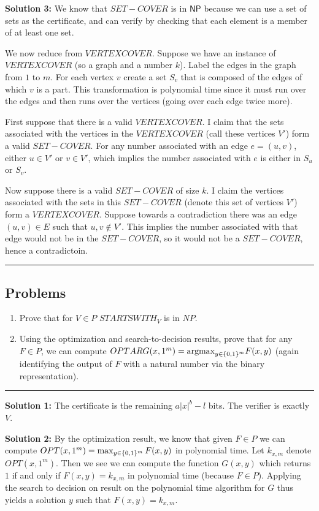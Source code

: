 \documentclass[10pt]{article}
\newcommand{\Line}{\vspace{.3cm}\hrule\vspace{.3cm}}
\begin{document}
\textbf{Solution 3:} We know that $SET-COVER$ is in $\mathsf{NP}$ because we can use a set of sets as the certificate, and can verify by checking that each element is a member of at least one set.

We now reduce from $VERTEXCOVER$. Suppose we have an instance of $VERTEXCOVER$ (so a graph and a number $k$). Label the edges in the graph from $1$ to $m$. For each vertex $v$ create a set $S_v$ that is composed of the edges of which $v$ is a part. This transformation is polynomial time since it must run over the edges and then runs over the vertices (going over each edge twice more).

First suppose that there is a valid $VERTEXCOVER$. I claim that the sets associated with the vertices in the $VERTEXCOVER$ (call these vertices $V'$) form a valid $SET-COVER$. For any number associated with an edge $e = (u,v)$, either $u\in V'$ or $v\in V'$, which implies the number associated with $e$ is either in $S_u$ or $S_v$.

Now suppose there is a valid $SET-COVER$ of size $k$. I claim the vertices associated with the sets in this $SET-COVER$ (denote this set of vertices $V'$) form a $VERTEXCOVER$. Suppose towards a contradiction there was an edge $(u,v)\in E$ such that $u,v\notin V'$. This implies the number associated with that edge would not be in the $SET-COVER$, so it would not be a $SET-COVER$, hence a contradictoin.

\Line
\subsection{Problems}
\begin{enumerate}
    \item Prove that for $V\in P$ $STARTSWITH_V$ is in $NP$.
    \item Using the optimization and search-to-decision results, prove that for any $F\in P$, we can compute $OPTARG(x,1^m) = \text{argmax}_{y\in \{0,1\}^m} F(x,y)$ (again identifying the output of $F$ with a natural number via the binary representation).
\end{enumerate}

\Line

\textbf{Solution 1:} The certificate is the remaining $a|x|^b-l$ bits. The verifier is exactly $V$.

\textbf{Solution 2:} By the optimization result, we know that given $F\in P$ we can compute $OPT(x,1^m) = \max_{y\in \{0,1\}^m}F(x,y)$ in polynomial time. Let $k_{x,m}$ denote $OPT(x,1^m)$. Then we see we can compute the function $G(x,y)$ which returns $1$ if and only if $F(x,y) = k_{x,m}$ in polynomial time (because $F\in P$). Applying the search to decision on result on the polynomial time algorithm for $G$ thus yields a solution $y$ such that $F(x,y) = k_{x,m}$.
\end{document}

